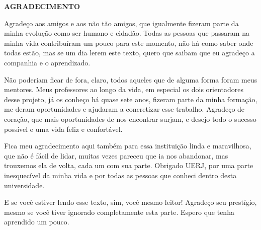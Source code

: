\begin{center}
\textbf{AGRADECIMENTO}
\end{center}

$\!$\\

Agradeço aos amigos e aos não tão amigos, que igualmente fizeram parte da minha evolução como ser humano e cidadão. Todas as pessoas que passaram na minha vida contribuíram um pouco para este momento, não há como saber onde todas estão, mas se um dia lerem este texto, quero que saibam que eu agradeço a companhia e o aprendizado.

Não poderiam ficar de fora, claro, todos aqueles que de alguma forma foram meus mentores. Meus professores ao longo da vida, em especial os dois orientadores desse projeto, já os conheço há quase sete anos, fizeram parte da minha formação, me deram oportunidades e ajudaram a concretizar esse trabalho. Agradeço de coração, que mais oportunidades de nos encontrar surjam, e desejo todo o sucesso possível e uma vida feliz e confortável.

Fica meu agradecimento aqui também para essa instituição linda e maravilhosa, que não é fácil de lidar, muitas vezes pareceu que ia nos abandonar, mas trouxemos ela de volta, cada um com sua parte. Obrigado UERJ, por uma parte inesquecível da minha vida e por todas as pessoas que conheci dentro desta universidade.

E se você estiver lendo esse texto, sim, você mesmo leitor! Agradeço seu prestígio, mesmo se você tiver ignorado completamente esta parte. Espero que tenha aprendido um pouco.
 